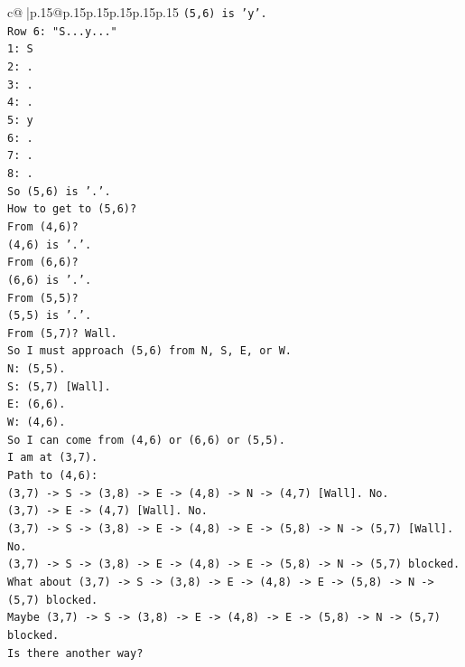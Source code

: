 \documentclass{article}
\begin{document}
{\begin{supertabular}{c@{$\;$}|p{.15\linewidth}@{}p{.15\linewidth}p{.15\linewidth}p{.15\linewidth}p{.15\linewidth}p{.15\linewidth}}
{{{\texttt{(5,6) is 'y'.} \\
\texttt{Row 6: "S...y..."} \\
\texttt{1: S} \\
\texttt{2: .} \\
\texttt{3: .} \\
\texttt{4: .} \\
\texttt{5: y} \\
\texttt{6: .} \\
\texttt{7: .} \\
\texttt{8: .} \\
\texttt{So (5,6) is '.'.} \\
\texttt{How to get to (5,6)?} \\
\texttt{From (4,6)?} \\
\texttt{(4,6) is '.'.} \\
\texttt{From (6,6)?} \\
\texttt{(6,6) is '.'.} \\
\texttt{From (5,5)?} \\
\texttt{(5,5) is '.'.} \\
\texttt{From (5,7)? Wall.} \\
\texttt{So I must approach (5,6) from N, S, E, or W.} \\
\texttt{N: (5,5).} \\
\texttt{S: (5,7) {[}Wall{]}.} \\
\texttt{E: (6,6).} \\
\texttt{W: (4,6).} \\
\texttt{So I can come from (4,6) or (6,6) or (5,5).} \\
\texttt{I am at (3,7).} \\
\texttt{Path to (4,6):} \\
\texttt{(3,7) {-}> S {-}> (3,8) {-}> E {-}> (4,8) {-}> N {-}> (4,7) {[}Wall{]}. No.} \\
\texttt{(3,7) {-}> E {-}> (4,7) {[}Wall{]}. No.} \\
\texttt{(3,7) {-}> S {-}> (3,8) {-}> E {-}> (4,8) {-}> E {-}> (5,8) {-}> N {-}> (5,7) {[}Wall{]}. No.} \\
\texttt{(3,7) {-}> S {-}> (3,8) {-}> E {-}> (4,8) {-}> E {-}> (5,8) {-}> N {-}> (5,7) blocked.} \\
\texttt{What about (3,7) {-}> S {-}> (3,8) {-}> E {-}> (4,8) {-}> E {-}> (5,8) {-}> N {-}> (5,7) blocked.} \\
\texttt{Maybe (3,7) {-}> S {-}> (3,8) {-}> E {-}> (4,8) {-}> E {-}> (5,8) {-}> N {-}> (5,7) blocked.} \\
\texttt{Is there another way?} \\
}}}
\end{supertabular}}
\end{document}
